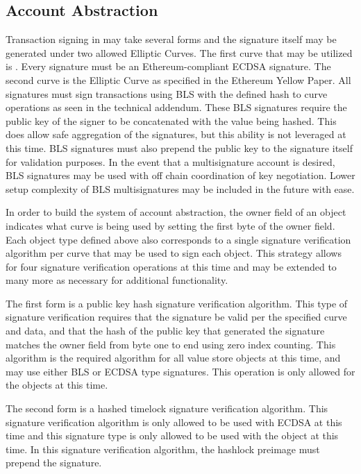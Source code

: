 \subsection{Account Abstraction}

Transaction signing in \LayerTwo{} may take several forms and the
signature itself may be generated under two allowed Elliptic Curves.
The first curve that may be utilized is \secp{}.
Every \secp{} signature must be an Ethereum-compliant ECDSA signature.
The second curve is the \bnEth{} Elliptic Curve as specified in the
Ethereum Yellow Paper.
All \bnEth{} signatures must sign transactions using BLS with the defined
hash to curve operations as seen in the technical addendum.
These BLS signatures require the public key of the signer to be
concatenated with the value being hashed.
This does allow safe aggregation of the signatures, but this ability is
not leveraged at this time.
BLS signatures must also prepend the public key to the signature itself
for validation purposes.
In the event that a multisignature account is desired, BLS signatures
may be used with off chain coordination of key negotiation.
Lower setup complexity of BLS multisignatures may be included in the
future with ease.

In order to build the system of account abstraction, the owner field of
an object indicates what curve is being used by setting the first byte
of the owner field.
Each object type defined above also corresponds to a single signature
verification algorithm per curve that may be used to sign each object.
This strategy allows for four signature verification operations at this
time and may be extended to many more as necessary for additional
functionality.

The first form is a public key hash signature verification algorithm.
This type of signature verification requires that the signature be
valid per the specified curve and data, and that the hash of the public
key that generated the signature matches the owner field from byte one
to end using zero index counting.
This algorithm is the required algorithm for all value store objects at
this time, and may use either BLS or ECDSA type signatures.
This operation is only allowed for the \ValueStore{} objects at this time.

The second form is a hashed timelock signature verification algorithm.
This signature verification algorithm is only allowed to be used with
ECDSA at this time and this signature type is only allowed to be used
with the \AtomicSwap{} object at this time.
In this signature verification algorithm, the hashlock preimage must
prepend the signature.

